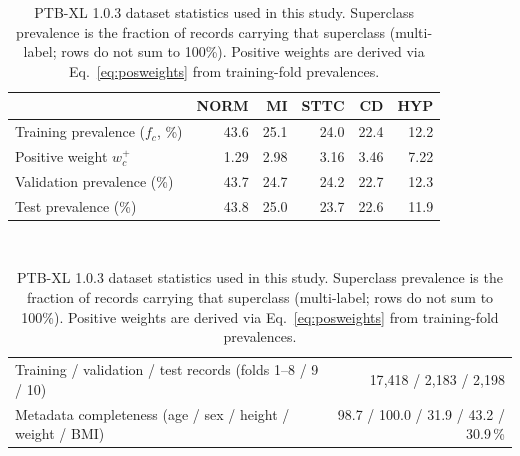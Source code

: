 \documentclass[mathematics,article,submit,pdftex]{Definitions/mdpi}
\def\textbf#1{#1}%
\begin{document}
\begin{table}[H]
\caption{PTB-XL 1.0.3 dataset statistics used in this study. Superclass prevalence is the fraction of records carrying that superclass (multi-label; rows do not sum to 100\%). Positive weights are derived via Eq.~\eqref{eq:posweights} from training-fold prevalences.}
\label{tab:dataset}
\centering
\small
\begin{tabular}{lrrrrr}
\toprule
 & \textbf{NORM} & \textbf{MI} & \textbf{STTC} & \textbf{CD} & \textbf{HYP} \\
\midrule
Training prevalence ($f_c$, \%)       & 43.6 & 25.1 & 24.0 & 22.4 & 12.2 \\
Positive weight $w_c^{+}$             & 1.29 & 2.98 & 3.16 & 3.46 & 7.22 \\
Validation prevalence (\%)            & 43.7 & 24.7 & 24.2 & 22.7 & 12.3 \\
Test prevalence (\%)                  & 43.8 & 25.0 & 23.7 & 22.6 & 11.9 \\
\bottomrule
\end{tabular}
\vspace{3pt}\\
\begin{tabularx}{\textwidth}{@{}>{\raggedright\arraybackslash}Xr@{}}
\toprule
Training / validation / test records (folds 1--8 / 9 / 10) & 17{,}418 / 2{,}183 / 2{,}198 \\
Metadata completeness (age / sex / height / weight / BMI) & 98.7 / 100.0 / 31.9 / 43.2 / 30.9\,\% \\
\bottomrule
\end{tabularx}
\end{table}
\end{document}
